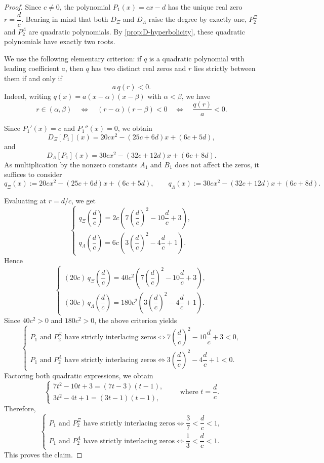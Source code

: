 \documentclass[11pt,twoside]{article}
\numberwithin{equation}{section}
\begin{document}
\begin{proof}
Since \(c \neq 0\), the polynomial \(P_1(x)=cx-d\) has the unique real zero
\(
r=\dfrac{d}{c}.
\)
Bearing in mind that both \(D_{\Xi}\) and \(D_{\Lambda}\) raise the degree by exactly one, \(P_2^{\Xi}\) and \(P_2^{\Lambda}\) are quadratic polynomials. By \cref{prop:D-hyperbolicity}, these quadratic polynomials have exactly two roots.

We use the following elementary criterion: if \(q\) is a quadratic polynomial with leading coefficient \(a\), then \(q\) has two distinct real zeros and \(r\) lies strictly between them if and only if
\[
a\,q(r)<0.
\]
Indeed, writing \(q(x)=a(x-\alpha)(x-\beta)\) with \(\alpha<\beta\), we have
\[
r\in(\alpha,\beta)
\quad\Longleftrightarrow\quad
(r-\alpha)(r-\beta)<0
\quad\Longleftrightarrow\quad
\frac{q(r)}{a}<0.
\]

Since \(P_1'(x)=c\) and \(P_1''(x)=0\), we obtain
\[
D_{\Xi}[P_1](x)=20cx^2-(25c+6d)x+(6c+5d),
\]
and
\[
D_{\Lambda}[P_1](x)=30cx^2-(32c+12d)x+(6c+8d).
\]
As multiplication by the nonzero constants \(A_1\) and \(B_1\) does not affect the zeros, it suffices to consider
\[
q_{\Xi}(x):=20cx^2-(25c+6d)x+(6c+5d),
\qquad
q_{\Lambda}(x):=30cx^2-(32c+12d)x+(6c+8d).
\]

Evaluating at \(r=d/c\), we get
\[
\begin{cases}
q_{\Xi}\!\left(\dfrac{d}{c}\right)
=2c\left(7\left(\dfrac{d}{c}\right)^2-10\dfrac{d}{c}+3\right),\\[1.2em]
q_{\Lambda}\!\left(\dfrac{d}{c}\right)
=6c\left(3\left(\dfrac{d}{c}\right)^2-4\dfrac{d}{c}+1\right).
\end{cases}
\]
Hence
\[
\begin{cases}
(20c)\,q_{\Xi}\!\left(\dfrac{d}{c}\right)
=40c^2\left(7\left(\dfrac{d}{c}\right)^2-10\dfrac{d}{c}+3\right),\\[1.2em]
(30c)\,q_{\Lambda}\!\left(\dfrac{d}{c}\right)
=180c^2\left(3\left(\dfrac{d}{c}\right)^2-4\dfrac{d}{c}+1\right).
\end{cases}
\]
Since \(40c^2>0\) and \(180c^2>0\), the above criterion yields
\[
\begin{cases}
P_1 \text{ and } P_2^{\Xi} \text{ have strictly interlacing zeros}
\iff
7\left(\dfrac{d}{c}\right)^2-10\dfrac{d}{c}+3<0,\\[1.2em]
P_1 \text{ and } P_2^{\Lambda} \text{ have strictly interlacing zeros}
\iff
3\left(\dfrac{d}{c}\right)^2-4\dfrac{d}{c}+1<0.
\end{cases}
\]
Factoring both quadratic expressions, we obtain
\[
\begin{cases}
7t^2-10t+3=(7t-3)(t-1),\\
3t^2-4t+1=(3t-1)(t-1),
\end{cases}
\qquad\text{where } t=\dfrac{d}{c}.
\]
Therefore,
\[
\begin{cases}
P_1 \text{ and } P_2^{\Xi} \text{ have strictly interlacing zeros}
\iff
\dfrac{3}{7}<\dfrac{d}{c}<1,\\[1.2em]
P_1 \text{ and } P_2^{\Lambda} \text{ have strictly interlacing zeros}
\iff
\dfrac{1}{3}<\dfrac{d}{c}<1.
\end{cases}
\]
This proves the claim.
\end{proof}
\end{document}
